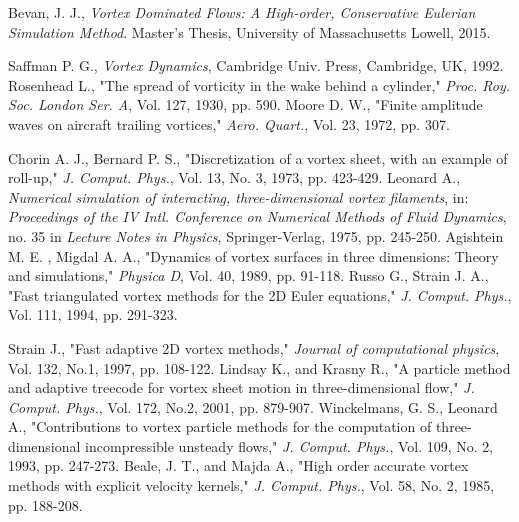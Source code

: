 \documentclass[]{aiaa-tc}%
\begin{document}

\newpage
\begin{thebibliography}{9}%
Bevan, J. J., \textit{Vortex Dominated Flows: A High-order, Conservative Eulerian Simulation Method}. Master's Thesis, University of Massachusetts Lowell, 2015.

Saffman P. G., \textit{Vortex Dynamics}, Cambridge Univ. Press, Cambridge, UK, 1992.
Rosenhead L., "The spread of vorticity in the wake behind a cylinder," \textit{Proc. Roy. Soc. London Ser. A}, Vol. 127, 1930, pp. 590.
Moore D. W., "Finite amplitude waves on aircraft trailing vortices," \textit{Aero. Quart.}, Vol. 23, 1972, pp. 307.

Chorin A. J., Bernard P. S., "Discretization of a vortex sheet, with an example of roll-up," \textit{J. Comput. Phys.}, Vol. 13, No. 3, 1973, pp. 423-429.
Leonard A., \textit{Numerical simulation of interacting, three-dimensional vortex filaments}, in: \textit{Proceedings of the IV Intl. Conference on Numerical Methods of Fluid Dynamics}, no. 35 in \textit{Lecture Notes in Physics}, Springer-Verlag, 1975, pp. 245-250.
Agishtein M. E. , Migdal A. A., "Dynamics of vortex surfaces in three dimensions: Theory and simulations," \textit{Physica D}, Vol. 40, 1989, pp. 91-118.
Russo G., Strain J. A., "Fast triangulated vortex methods for the 2D Euler equations," \textit{J. Comput. Phys.}, Vol. 111, 1994, pp. 291-323.

Strain J., "Fast adaptive 2D vortex methods," \textit{Journal of computational physics}, Vol. 132, No.1, 1997, pp. 108-122.
Lindsay K., and Krasny R., "A particle method and adaptive treecode for vortex sheet motion in three-dimensional flow," \textit{J. Comput. Phys.}, Vol. 172, No.2, 2001, pp. 879-907.
Winckelmans, G. S., Leonard A., "Contributions to vortex particle methods for the computation of three-dimensional incompressible unsteady flows," \textit{J. Comput. Phys.}, Vol. 109, No. 2, 1993, pp. 247-273.
Beale, J. T., and Majda A., "High order accurate vortex methods with explicit velocity kernels," \textit{J. Comput. Phys.}, Vol. 58, No. 2, 1985, pp. 188-208.


\end{thebibliography}
\end{document}
